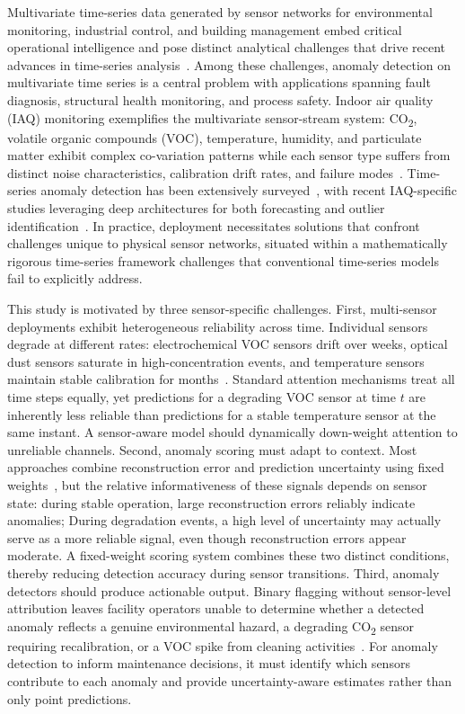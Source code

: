 Multivariate time-series data generated by sensor networks for environmental monitoring, industrial control, and building management embed critical operational intelligence and pose distinct analytical challenges that drive recent advances in time-series analysis~\cite{kumar2022iaq_review, szczurek2020iaq}. Among these challenges, anomaly detection on multivariate time series is a central problem with applications spanning fault diagnosis, structural health monitoring, and process safety. Indoor air quality (IAQ) monitoring exemplifies the multivariate sensor-stream system: CO\textsubscript{2}, volatile organic compounds (VOC), temperature, humidity, and particulate matter exhibit complex co-variation patterns while each sensor type suffers from distinct noise characteristics, calibration drift rates, and failure modes~\cite{coleman_sensing_2018, abid2021iaq_deep}. Time-series anomaly detection has been extensively surveyed~\cite{chandola2009survey, aggarwal2017outlier, pang2021deep_survey}, with recent IAQ-specific studies leveraging deep architectures for both forecasting and outlier identification~\cite{choi2024air_anomaly, wei2023lstm_ae_iaq}. In practice, deployment necessitates solutions that confront challenges unique to physical sensor networks, situated within a mathematically rigorous time-series framework challenges that conventional time-series models fail to explicitly address.

This study is motivated by three sensor-specific challenges. First, multi-sensor deployments exhibit heterogeneous reliability across time. Individual sensors degrade at different rates: electrochemical VOC sensors drift over weeks, optical dust sensors saturate in high-concentration events, and temperature sensors maintain stable calibration for months~\cite{sanchez-ferrera_review_2025}. Standard attention mechanisms treat all time steps equally, yet predictions for a degrading VOC sensor at time $t$ are inherently less reliable than predictions for a stable temperature sensor at the same instant. A sensor-aware model should dynamically down-weight attention to unreliable channels. Second, anomaly scoring must adapt to context. Most approaches combine reconstruction error and prediction uncertainty using fixed weights~\cite{ghimire_electricity_2025, cui_sde-hnn_2025}, but the relative informativeness of these signals depends on sensor state: during stable operation, large reconstruction errors reliably indicate anomalies; During degradation events, a high level of uncertainty may actually serve as a more reliable signal, even though reconstruction errors appear moderate. A fixed-weight scoring system combines these two distinct conditions, thereby reducing detection accuracy during sensor transitions. Third, anomaly detectors should produce actionable output. Binary flagging without sensor-level attribution leaves facility operators unable to determine whether a detected anomaly reflects a genuine environmental hazard, a degrading CO\textsubscript{2} sensor requiring recalibration, or a VOC spike from cleaning activities~\cite{xu2022anomalytransformer}. For anomaly detection to inform maintenance decisions, it must identify which sensors contribute to each anomaly and provide uncertainty-aware estimates rather than only point predictions.

